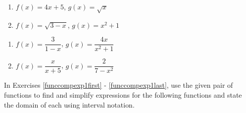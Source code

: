 \begin{multicols}{2}
\begin{enumerate}
\setcounter{enumi}{\value{HW}}

\item  $f(x) = 4x+5$, $g(x) = \sqrt{x}$
\item  $f(x) = \sqrt{3-x}$, $g(x) = x^2+1$

\setcounter{HW}{\value{enumi}}
\end{enumerate}
\end{multicols}




\begin{multicols}{2}
\begin{enumerate}
\setcounter{enumi}{\value{HW}}

\item  $f(x) = \dfrac{3}{1-x}$, $g(x) = \dfrac{4x}{x^2+1}$
\item  $f(x) = \dfrac{x}{x+5}$, $g(x) = \dfrac{2}{7-x^2}$ \label{funccompeval1last}


\setcounter{HW}{\value{enumi}}
\end{enumerate}
\end{multicols}




\newpage

In Exercises \ref{funccompexp1first} - \ref{funccompexp1last}, use the given pair of functions to find and simplify expressions for the following functions and state the domain of each using interval notation.

